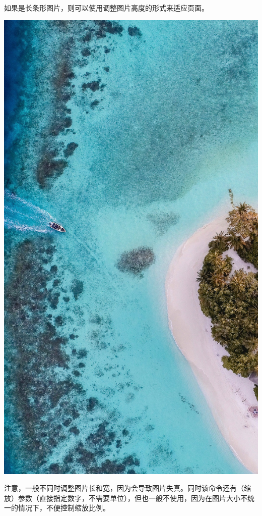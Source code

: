     如果是长条形图片，则可以使用调整图片高度的形式来适应页面。
    \begin{texshow}
        \includegraphics[height=0.4\textheight]{contents/fig/ocean.jpg}
    \end{texshow}

    注意，一般不同时调整图片长和宽，因为会导致图片失真。同时该命令还有（缩放）参数（直接指定数字，不需要单位），但也一般不使用，因为在图片大小不统一的情况下，不便控制缩放比例。


